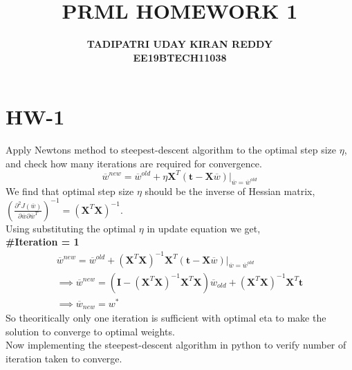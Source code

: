 \documentclass{article}
\begin{document}
\title{{\textbf{PRML HOMEWORK 1}}}
\author{\textbf{TADIPATRI UDAY KIRAN REDDY}\\\textbf{EE19BTECH11038}}
\maketitle

\section*{\hfil HW-1}
Apply Newtons method to steepest-descent algorithm to the optimal step size $\eta$, and check how many iterations are required for convergence.
\begin{equation*}
\overline{w}^{new} = \overline{w}^{old} + \eta{\mathbf{X}^T(\mathbf{t}-\mathbf{X}\overline{w})}|_{\overline{w} = \overline{w}^{old}}
\end{equation*}
\newline
\newline
We find that optimal step size $\eta$ should be the inverse of Hessian matrix, $\left(\frac{{\partial}^2 J(\overline{w})}{\partial \overline{w} \partial \overline{w}^T}\right)^{-1} = \left(\textbf{X}^T\textbf{X}\right)^{-1}$.\\
Using substituting the optimal $\eta$ in update equation we get,\\
\textbf{\#Iteration = 1}
\begin{gather*}
\overline{w}^{new} = \overline{w}^{old} + \left(\textbf{X}^T\textbf{X}\right)^{-1}{\mathbf{X}^T(\mathbf{t}-\mathbf{X}\overline{w})}|_{\overline{w} = \overline{w}^{old}}\\
\implies \overline{w}^{new} = \left(\textbf{I} - \left(\textbf{X}^T\textbf{X}\right)^{-1}\textbf{X}^T\textbf{X}\right){\overline{w}_{old}} + \left(\textbf{X}^T\textbf{X}\right)^{-1}{\mathbf{X}^T\mathbf{t}}\\
\implies \overline{w}_{new} = w^{*}
\end{gather*}
So theoritically only one iteration is sufficient with optimal eta to make the solution to converge to optimal weights.\\
Now implementing the steepest-descent algorithm in python to verify number of iteration taken to converge.
\end{document}
